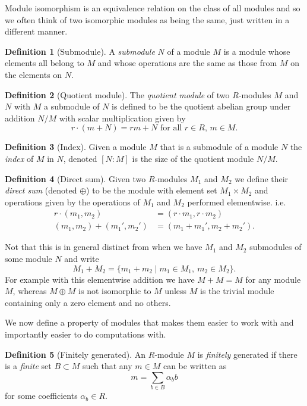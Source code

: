 \documentclass[a4paper,abstracton,bibtotoc]{scrreprt}
\theoremstyle{definition}
\newtheorem{defn}{Definition}
\begin{document}
Module isomorphism is an equivalence relation on the class of all modules and so we often think of two isomorphic modules as being the same, just written in a different manner.

\begin{defn}[Submodule]
A \emph{submodule} $N$ of a module $M$ is a module whose elements all belong to $M$ and whose operations are the same as those from $M$ on the elements on $N$.
\end{defn}

\begin{defn}[Quotient module]
The \emph{quotient module} of two $R$-modules $M$ and $N$ with $M$ a submodule of $N$ is defined to be the quotient abelian group under addition $N/
M$ with scalar multiplication given by
\[
r\cdot(m + N) = rm + N\text{ for all $r\in R$, $m\in M$}.
\]
\end{defn}

\begin{defn}[Index]
Given a module $M$ that is a submodule of a module $N$ the \emph{index} of $M$ in $N$, denoted $[N:M]$ is the size of the quotient module $N / M$.
\end{defn}

\begin{defn}[Direct sum]
Given two $R$-modules $M_1$ and $M_2$ we define their \emph{direct sum} (denoted $\oplus$) to be the module with element set $M_1 \times M_2$ and operations given by the operations of $M_1$ and $M_2$ performed elementwise. i.e.
\begin{align*}
r\cdot(m_1,m_2) &= (r\cdot m_1, r\cdot m_2)\\
(m_1,m_2) + (m_1',m_2') &= (m_1 + m_1',m_2+m_2').
\end{align*}
\end{defn}

Not that this is in general distinct from when we have $M_1$ and $M_2$ submodules of some module $N$ and write
\[
M_1 + M_2 = \{m_1 + m_2 \mid m_1\in M_1,\ m_2\in M_2\}.
\]
For example with this elementwise addition we have $M + M = M$ for any module $M$, whereas $M\oplus M$ is not isomorphic to $M$ unless $M$ is the trivial module containing only a zero element and no others.

\minisec{}
We now define a property of modules that makes them easier to work with and importantly easier to do computations with.

\begin{defn}[Finitely generated]
An $R$-module $M$ is \emph{finitely} generated if there is a \emph{finite} set $B\subset M$ such that any $m\in M$ can be written as
\[m = \sum_{b\in B} \alpha_b b\]
for some coefficients $\alpha_b \in R$.
\end{defn}
\end{document}
